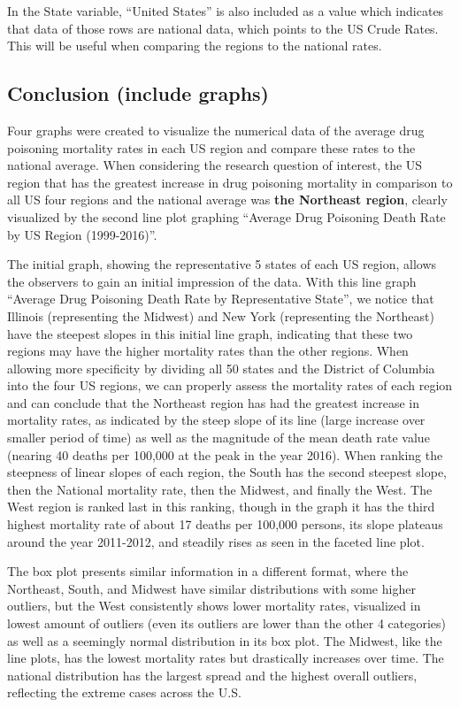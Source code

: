 \documentclass[
]{article}
\begin{document}
In the State variable, ``United States'' is also included as a value
which indicates that data of those rows are national data, which points
to the US Crude Rates. This will be useful when comparing the regions to
the national rates.

\subsection{Conclusion (include
graphs)}\label{conclusion-include-graphs}

Four graphs were created to visualize the numerical data of the average
drug poisoning mortality rates in each US region and compare these rates
to the national average. When considering the research question of
interest, the US region that has the greatest increase in drug poisoning
mortality in comparison to all US four regions and the national average
was \textbf{the Northeast region}, clearly visualized by the second line
plot graphing ``Average Drug Poisoning Death Rate by US Region
(1999-2016)''.

The initial graph, showing the representative 5 states of each US
region, allows the observers to gain an initial impression of the data.
With this line graph ``Average Drug Poisoning Death Rate by
Representative State'', we notice that Illinois (representing the
Midwest) and New York (representing the Northeast) have the steepest
slopes in this initial line graph, indicating that these two regions may
have the higher mortality rates than the other regions. When allowing
more specificity by dividing all 50 states and the District of Columbia
into the four US regions, we can properly assess the mortality rates of
each region and can conclude that the Northeast region has had the
greatest increase in mortality rates, as indicated by the steep slope of
its line (large increase over smaller period of time) as well as the
magnitude of the mean death rate value (nearing 40 deaths per 100,000 at
the peak in the year 2016). When ranking the steepness of linear slopes
of each region, the South has the second steepest slope, then the
National mortality rate, then the Midwest, and finally the West. The
West region is ranked last in this ranking, though in the graph it has
the third highest mortality rate of about 17 deaths per 100,000 persons,
its slope plateaus around the year 2011-2012, and steadily rises as seen
in the faceted line plot.

The box plot presents similar information in a different format, where
the Northeast, South, and Midwest have similar distributions with some
higher outliers, but the West consistently shows lower mortality rates,
visualized in lowest amount of outliers (even its outliers are lower
than the other 4 categories) as well as a seemingly normal distribution
in its box plot. The Midwest, like the line plots, has the lowest
mortality rates but drastically increases over time. The national
distribution has the largest spread and the highest overall outliers,
reflecting the extreme cases across the U.S.
\end{document}
